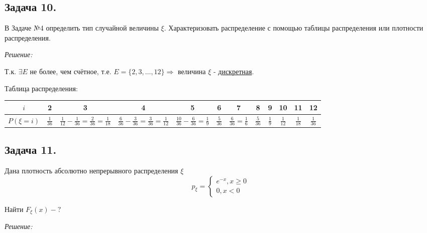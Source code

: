 \subsection*{Задача 10.}

В Задаче №4 определить тип случайной величины $\xi$. Характеризовать распределение с помощью таблицы распределения или плотности распределения.

\noindent \textit{Решение:}

Т.к. $\exists E$ не более, чем счётное, т.е. $E = \{ 2,3,\dots,12 \} \Rightarrow$ величина $\xi$ - \underline{дискретная}.

Таблица распределения:
\begin{table}[H]
	\centering\makegapedcells
	\begin{tabular}{|c|c|c|c|c|c|c|c|c|c|c|c|}
		\hline
		$i$          & 2              & 3                                                     & 4                                                     & 5                                        & 6              & 7                          & 8              & 9             & 10             & 11             & 12             \\ \hline
		$P(\xi = i)$ & $\frac{1}{36}$ & $\frac{1}{12}-\frac{1}{36}=\frac{2}{36}=\frac{1}{18}$ & $\frac{6}{36}-\frac{3}{36}=\frac{3}{36}=\frac{1}{12}$ & $\frac{10}{36}-\frac{6}{36}=\frac{1}{9}$ & $\frac{5}{36}$ & $\frac{6}{36}=\frac{1}{6}$ & $\frac{5}{36}$ & $\frac{1}{9}$ & $\frac{1}{12}$ & $\frac{1}{18}$ & $\frac{1}{36}$ \\ \hline
	\end{tabular}
\end{table}

\subsection*{Задача 11.}

Дана плотность абсолютно непрерывного распределения $\xi$
\[
p_{\xi} =
\begin{cases}
	e^{-x}, x \ge 0 \\
	0, x < 0
\end{cases}
\]

Найти $F_{\xi}(x) - ?$

\noindent \textit{Решение:}

